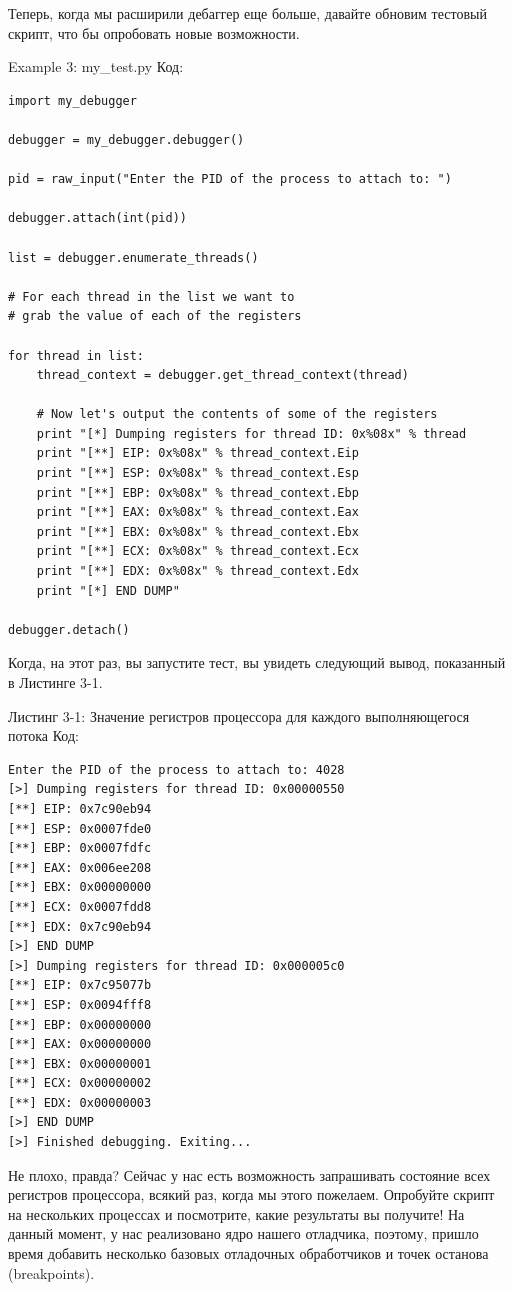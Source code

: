 \documentclass[12pt, a4paper, oneside]{book}
\begin{document}
Теперь, когда мы расширили дебаггер еще больше, давайте обновим тестовый скрипт, что бы опробовать новые возможности.

Example 3: my\_test.py
Код:
\begin{verbatim}
import my_debugger

debugger = my_debugger.debugger()

pid = raw_input("Enter the PID of the process to attach to: ")

debugger.attach(int(pid))

list = debugger.enumerate_threads()

# For each thread in the list we want to
# grab the value of each of the registers

for thread in list:
    thread_context = debugger.get_thread_context(thread)

    # Now let's output the contents of some of the registers
    print "[*] Dumping registers for thread ID: 0x%08x" % thread
    print "[**] EIP: 0x%08x" % thread_context.Eip
    print "[**] ESP: 0x%08x" % thread_context.Esp
    print "[**] EBP: 0x%08x" % thread_context.Ebp
    print "[**] EAX: 0x%08x" % thread_context.Eax
    print "[**] EBX: 0x%08x" % thread_context.Ebx
    print "[**] ECX: 0x%08x" % thread_context.Ecx
    print "[**] EDX: 0x%08x" % thread_context.Edx
    print "[*] END DUMP"

debugger.detach()
\end{verbatim}

Когда, на этот раз, вы запустите тест, вы увидеть следующий вывод, показанный в Листинге 3-1.

Листинг 3-1: Значение регистров процессора для каждого выполняющегося потока
Код:
\begin{verbatim}
Enter the PID of the process to attach to: 4028
[>] Dumping registers for thread ID: 0x00000550
[**] EIP: 0x7c90eb94
[**] ESP: 0x0007fde0
[**] EBP: 0x0007fdfc
[**] EAX: 0x006ee208
[**] EBX: 0x00000000
[**] ECX: 0x0007fdd8
[**] EDX: 0x7c90eb94
[>] END DUMP
[>] Dumping registers for thread ID: 0x000005c0
[**] EIP: 0x7c95077b
[**] ESP: 0x0094fff8
[**] EBP: 0x00000000
[**] EAX: 0x00000000
[**] EBX: 0x00000001
[**] ECX: 0x00000002
[**] EDX: 0x00000003
[>] END DUMP
[>] Finished debugging. Exiting...
\end{verbatim}

Не плохо, правда? Сейчас у нас есть возможность запрашивать состояние всех регистров процессора, всякий раз, когда мы этого пожелаем. Опробуйте скрипт на нескольких процессах и посмотрите, какие результаты вы получите! На данный момент, у нас реализовано ядро нашего отладчика, поэтому, пришло время добавить несколько базовых отладочных обработчиков и точек останова (breakpoints).
\end{document}
